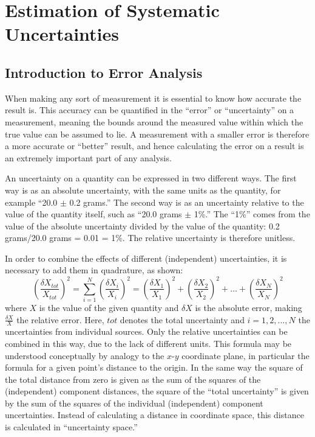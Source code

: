 \section{Estimation of Systematic Uncertainties}
\label{anMeth:Systs}


\subsection{Introduction to Error Analysis}
\label{anMeth:SystsIntro}

When making any sort of measurement it is essential 
to know how accurate the result is.  
This accuracy can be quantified in the 
``error'' or ``uncertainty'' 
on a measurement, 
meaning the bounds around the measured value 
within which the true value can be assumed to lie.  
A measurement with a smaller error is 
therefore a more accurate or ``better'' result, 
and hence calculating the error on a result is 
an extremely important part of 
any analysis.  

An uncertainty on a quantity can be 
expressed in two different ways.  
The first way is as an absolute uncertainty, 
with the same units as the quantity, 
for example ``20.0 $\pm$ 0.2 grams.''  
The second way is as an uncertainty 
relative to the value of the quantity itself, 
such as ``20.0 grams $\pm$ 1\%.''  
The ``1\%'' comes from the value of the absolute 
uncertainty divided by the value of the quantity: 
0.2 grams/20.0 grams = 0.01 = 1\%. 
The relative uncertainty is therefore unitless.  


In order to combine the effects of 
different (independent) uncertainties, 
it is necessary to add them 
in quadrature, as shown:
\[
\left(\frac{\delta X_{tot}}{X_{tot}}\right)^2 
= \sum_{i=1}^{N} \left(\frac{\delta X_i}{X_i}\right)^2 
= \left(\frac{\delta X_1}{X_1}\right)^2 
+ \left(\frac{\delta X_2}{X_2}\right)^2 
+ \ldots
+ \left(\frac{\delta X_N}{X_N}\right)^2 
\]
where 
$X$ is the value of the given quantity and 
$\delta X$ is the absolute error, 
making $\frac{\delta X}{X}$ the relative error.  
Here, $tot$ denotes the total uncertainty 
and $i=1,2,\ldots ,N$ the uncertainties from 
individual sources.  
Only the relative uncertainties 
can be combined in this way, 
due to the lack of different units.  
This formula may be understood 
conceptually by analogy to the 
$x$-$y$ coordinate plane, in particular 
the formula for a given point's distance 
to the origin.  
In the same way the square of the total distance 
from zero is given as the sum of the squares 
of the (independent) component distances, 
the square of the ``total uncertainty'' 
is given by the sum of the squares of the 
individual (independent) component uncertainties.  
Instead of calculating a distance in %
coordinate space, 
this distance is calculated in 
``uncertainty space.''

